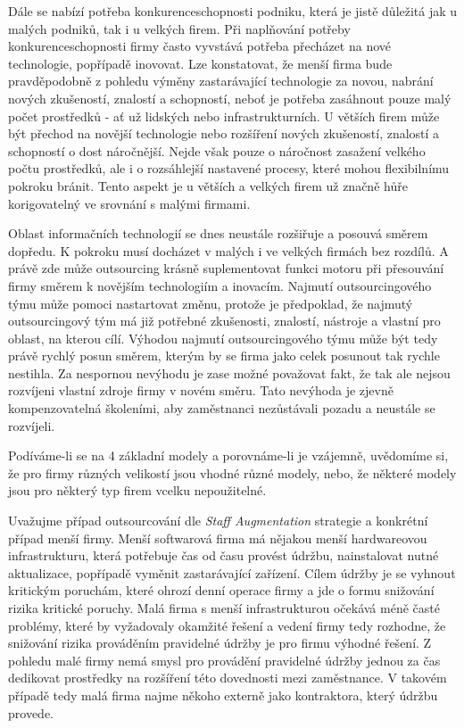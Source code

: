 \documentclass[a4paper,12pt]{article}
\begin{document}
    Dále se nabízí potřeba konkurenceschopnosti podniku, která je jistě důležitá jak u malých podniků, tak i u velkých firem. Při naplňování potřeby konkurenceschopnosti firmy často vyvstává potřeba přecházet na nové technologie, popřípadě inovovat. Lze konstatovat, že menší firma bude pravděpodobně  z pohledu výměny zastarávající technologie za novou, nabrání nových zkušeností, znalostí a schopností, neboť je potřeba zasáhnout pouze malý počet prostředků - ať už lidských nebo infrastrukturních. U větších firem může být přechod na novější technologie nebo rozšíření nových zkušeností, znalostí a schopností o dost náročnější. Nejde však pouze o náročnost zasažení velkého počtu prostředků, ale i o rozsáhlejší nastavené procesy, které mohou flexibilnímu pokroku bránit. Tento aspekt je u větších a velkých firem už značně hůře korigovatelný ve srovnání s malými firmami.

    Oblast informačních technologií se dnes neustále rozšiřuje a posouvá směrem dopředu. K pokroku musí docházet v malých i ve velkých firmách bez rozdílů. A právě zde může outsourcing krásně suplementovat funkci motoru při přesouvání firmy směrem k novějším technologiím a inovacím. Najmutí outsourcingového týmu může pomoci nastartovat změnu, protože je předpoklad, že najmutý outsourcingový tým má již potřebné zkušenosti, znalostí, nástroje a vlastní  pro oblast, na kterou cílí. Výhodou najmutí outsourcingového týmu může být tedy právě rychlý posun směrem, kterým by se firma jako celek posunout tak rychle nestihla. Za nespornou nevýhodu je zase možné považovat fakt, že tak ale nejsou rozvíjeni vlastní zdroje firmy v novém směru. Tato nevýhoda je zjevně kompenzovatelná školeními, aby zaměstnanci nezůstávali pozadu a neustále se rozvíjeli.

    Podíváme-li se na 4 základní modely a porovnáme-li je vzájemně, uvědomíme si, že pro firmy různých velikostí jsou vhodné různé modely, nebo, že některé modely jsou pro některý typ firem vcelku nepoužitelné. 

    Uvažujme případ outsourcování dle \textit{Staff Augmentation} strategie a konkrétní případ menší firmy. Menší softwarová firma má nějakou menší hardwareovou infrastrukturu, která potřebuje čas od času provést údržbu, nainstalovat nutné aktualizace, popřípadě vyměnit zastarávající zařízení. Cílem údržby je se vyhnout kritickým poruchám, které ohrozí denní operace firmy a jde o formu snižování rizika kritické poruchy. Malá firma s menší infrastrukturou očekává méně časté problémy, které by vyžadovaly okamžité řešení a vedení firmy tedy rozhodne, že snižování rizika prováděním pravidelné údržby je pro firmu výhodné řešení. Z pohledu malé firmy nemá smysl pro provádění pravidelné údržby jednou za čas dedikovat prostředky na rozšíření této dovednosti mezi zaměstnance. V takovém případě tedy malá firma najme někoho externě jako kontraktora, který údržbu provede. 
\end{document}
